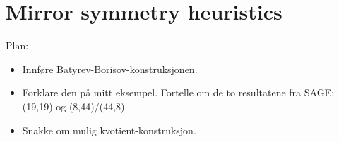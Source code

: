 \chapter{Mirror symmetry heuristics}
\label{sec:mirrorsym}

Plan:

\begin{itemize}
	\item Innføre Batyrev-Borisov-konstruksjonen.
	\item Forklare den på mitt eksempel. Fortelle om de to resultatene fra SAGE: (19,19) og (8,44)/(44,8).
	\item Snakke om mulig kvotient-konstruksjon.
\end{itemize}